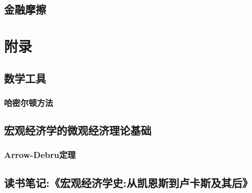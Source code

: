 \documentclass[lang=cn,10pt]{elegantbook}
\begin{document}
\chapter{金融摩擦}

\part{附录}
\chapter{数学工具}
\section{哈密尔顿方法}
\chapter{宏观经济学的微观经济理论基础}
\section{Arrow-Debru定理}
\chapter{读书笔记:《宏观经济学史:从凯恩斯到卢卡斯及其后》}
\end{document}
